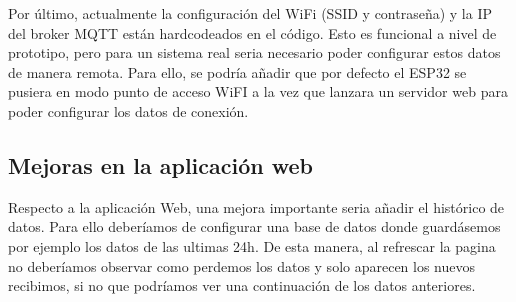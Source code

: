 \begin{titlepage}
Por último, actualmente la configuración del WiFi (SSID y contraseña) y la IP del broker MQTT están hardcodeados en el código. Esto es funcional a nivel de prototipo, pero para un sistema real seria necesario poder configurar estos datos de manera remota. Para ello, se podría añadir que por defecto el ESP32 se pusiera en modo punto de acceso WiFI a la vez que lanzara un servidor web para poder configurar los datos de conexión. \\
\subsection{Mejoras en la aplicación web}
Respecto a la aplicación Web, una mejora importante seria añadir el histórico de datos. Para ello deberíamos de configurar una base de datos donde guardásemos por ejemplo los datos de las ultimas 24h. De esta manera, al refrescar la pagina no deberíamos observar como perdemos los datos y solo aparecen los nuevos recibimos, si no que podríamos ver una continuación de los datos anteriores. \\

\end{titlepage}
